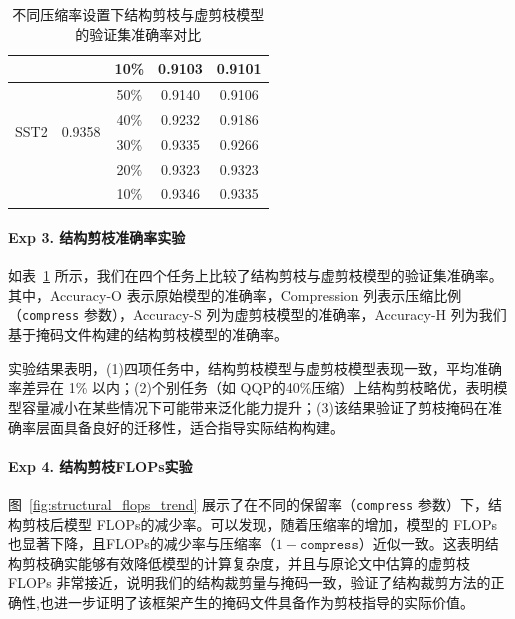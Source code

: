 \documentclass[UTF8,openany]{ctexbook}
\begin{document}
\begin{table}[H]
\begin{tabular}{lcccc}
         &                         & 10\% & \cellcolor{lightgray}0.9103 & \cellcolor{darkgray}0.9101 \\
    \midrule
    \multirow{4}{*}{SST2} 
         & \multirow{4}{*}{0.9358} & 50\% & \cellcolor{lightgray}0.9140 & \cellcolor{darkgray}0.9106 \\
         &                         & 40\% & \cellcolor{lightgray}0.9232 & \cellcolor{darkgray}0.9186 \\
         &                         & 30\% & \cellcolor{lightgray}0.9335 & \cellcolor{darkgray}0.9266 \\
         &                         & 20\% & \cellcolor{lightgray}0.9323 & \cellcolor{darkgray}0.9323 \\
         &                         & 10\% & \cellcolor{lightgray}0.9346 & \cellcolor{darkgray}0.9335 \\
    \bottomrule
    \end{tabular}
    \caption{不同压缩率设置下结构剪枝与虚剪枝模型的验证集准确率对比}
    \label{fig:structural_vs_virtual_acc}
\end{table}

\paragraph{Exp 3. 结构剪枝准确率实验 }如表~\ref{fig:structural_vs_virtual_acc} 所示，我们在四个任务上比较了结构剪枝与虚剪枝模型的验证集准确率。其中，Accuracy-O 表示原始模型的准确率，Compression 列表示压缩比例（\texttt{compress} 参数），Accuracy-S 列为虚剪枝模型的准确率，Accuracy-H 列为我们基于掩码文件构建的结构剪枝模型的准确率。

实验结果表明，(1)四项任务中，结构剪枝模型与虚剪枝模型表现一致，平均准确率差异在 1\% 以内；(2)个别任务（如 QQP的40\%压缩）上结构剪枝略优，表明模型容量减小在某些情况下可能带来泛化能力提升；(3)该结果验证了剪枝掩码在准确率层面具备良好的迁移性，适合指导实际结构构建。


\paragraph{Exp 4. 结构剪枝FLOPs实验 }图~\ref{fig:structural_flops_trend} 展示了在不同的保留率（\texttt{compress} 参数）下，结构剪枝后模型 FLOPs的减少率。可以发现，随着压缩率的增加，模型的 FLOPs 也显著下降，且FLOPs的减少率与压缩率（$1 - \texttt{compress}$）近似一致。这表明结构剪枝确实能够有效降低模型的计算复杂度，并且与原论文中估算的虚剪枝 FLOPs 非常接近，说明我们的结构裁剪量与掩码一致，验证了结构裁剪方法的正确性,也进一步证明了该框架产生的掩码文件具备作为剪枝指导的实际价值。
\end{document}
